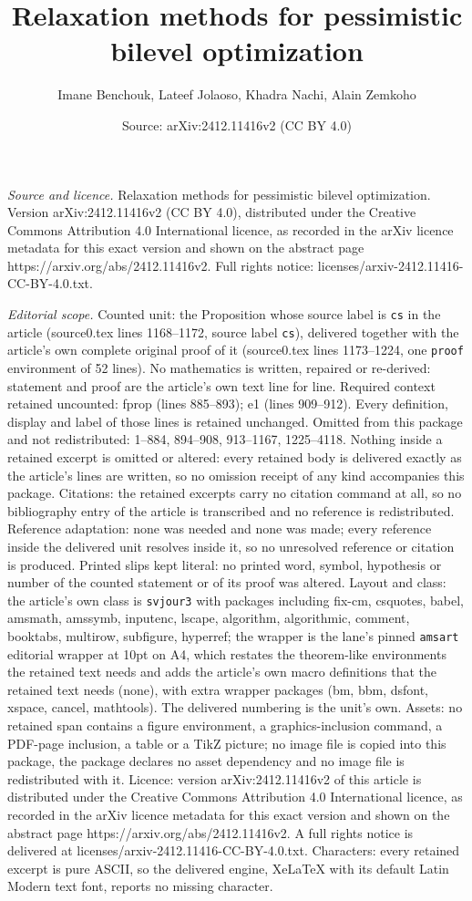 \documentclass[10pt,a4paper]{amsart}
\title[Relaxation methods for pessimistic bilevel optimization]{Relaxation methods for pessimistic bilevel optimization}
\author{Imane Benchouk, Lateef Jolaoso, Khadra Nachi, Alain Zemkoho}
\date{Source: arXiv:2412.11416v2 (CC BY 4.0)}
\begin{document}
\maketitle

\noindent\emph{Source and licence.} Relaxation methods for pessimistic bilevel optimization. Version arXiv:2412.11416v2 (CC BY 4.0), distributed under the Creative Commons Attribution 4.0 International licence, as recorded in the arXiv licence metadata for this exact version and shown on the abstract page https://arxiv.org/abs/2412.11416v2. Full rights notice: licenses/arxiv-2412.11416-CC-BY-4.0.txt.\par\smallskip

\noindent\textit{Editorial scope.} Counted unit: the Proposition whose source label is \texttt{cs} in the article (source0.tex lines 1168--1172, source label \texttt{cs}), delivered together with the article's own complete original proof of it (source0.tex lines 1173--1224, one \texttt{proof} environment of 52 lines). No mathematics is written, repaired or re-derived: statement and proof are the article's own text line for line. Required context retained uncounted: fprop (lines 885--893); e1 (lines 909--912). Every definition, display and label of those lines is retained unchanged. Omitted from this package and not redistributed: 1--884, 894--908, 913--1167, 1225--4118. Nothing inside a retained excerpt is omitted or altered: every retained body is delivered exactly as the article's lines are written, so no omission receipt of any kind accompanies this package. Citations: the retained excerpts carry no citation command at all, so no bibliography entry of the article is transcribed and no reference is redistributed. Reference adaptation: none was needed and none was made; every reference inside the delivered unit resolves inside it, so no unresolved reference or citation is produced. Printed slips kept literal: no printed word, symbol, hypothesis or number of the counted statement or of its proof was altered. Layout and class: the article's own class is \texttt{svjour3} with packages including fix-cm, csquotes, babel, amsmath, amssymb, inputenc, lscape, algorithm, algorithmic, comment, booktabs, multirow, subfigure, hyperref; the wrapper is the lane's pinned \texttt{amsart} editorial wrapper at 10pt on A4, which restates the theorem-like environments the retained text needs and adds the article's own macro definitions that the retained text needs (none), with extra wrapper packages (bm, bbm, dsfont, xspace, cancel, mathtools). The delivered numbering is the unit's own. Assets: no retained span contains a figure environment, a graphics-inclusion command, a PDF-page inclusion, a table or a TikZ picture; no image file is copied into this package, the package declares no asset dependency and no image file is redistributed with it. Licence: version arXiv:2412.11416v2 of this article is distributed under the Creative Commons Attribution 4.0 International licence, as recorded in the arXiv licence metadata for this exact version and shown on the abstract page https://arxiv.org/abs/2412.11416v2. A full rights notice is delivered at licenses/arxiv-2412.11416-CC-BY-4.0.txt. Characters: every retained excerpt is pure ASCII, so the delivered engine, XeLaTeX with its default Latin Modern text font, reports no missing character.
\end{document}
